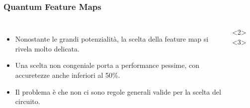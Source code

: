 \documentclass{beamer}
\begin{document}
\begin{frame}
  \frametitle{Quantum Feature Maps}

  \begin{columns}
  
    \begin{itemize}
      \item<1-> Nonostante le grandi potenzialità, la scelta della feature map si rivela molto delicata.
          \item<2-> Una scelta non congeniale porta a performance pessime, con accuretezze anche inferiori al 50\%. 
      
          \item<3-> Il problema è che non ci sono regole generali valide per la scelta del circuito. 
          
          \end{itemize}
    

     <2>
 <3>


\end{columns}
\end{frame}
\end{document}
